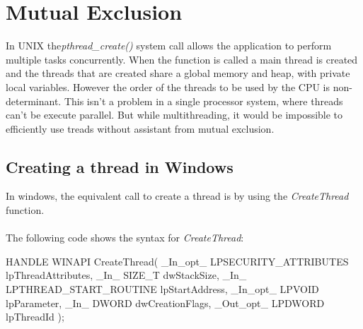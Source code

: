 \documentclass[a4paper]{article}
\begin{document}
\section{Mutual Exclusion }
In UNIX the\textit{pthread\_create()} system call allows the application to perform multiple tasks concurrently.
When the function is called a main thread is created and the threads that are created share a global memory and heap, with private local variables. However the order of the threads to be used by the CPU is non-determinant. This isn’t a problem in a single processor system, where threads can’t be execute parallel. But while multithreading, it would be impossible to efficiently use treads without assistant from mutual exclusion.  
\subsection{Creating a thread in Windows}
In windows, the equivalent call to create a thread is by using the \textit{CreateThread} function.\\\\
The following code shows the syntax for \textit{CreateThread}:\\
\begin{code}

HANDLE WINAPI CreateThread(
  	_In_opt_   LPSECURITY_ATTRIBUTES lpThreadAttributes,
  	_In_       SIZE_T dwStackSize,
  	_In_       LPTHREAD_START_ROUTINE lpStartAddress,
	_In_opt_   LPVOID lpParameter,
 	_In_       DWORD dwCreationFlags,
 	_Out_opt_  LPDWORD lpThreadId
);

\end{code}\\
\end{document}
